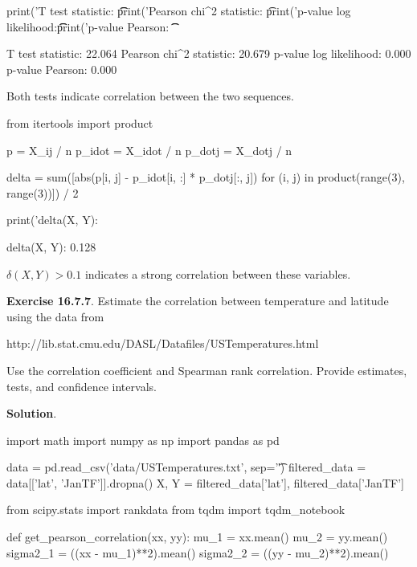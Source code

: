 {\begin{python}
print('T test statistic: \t\t%
print('Pearson chi^2 statistic: \t%

print('p-value log likelihood:\t\t %
print('p-value Pearson: \t\t %
\end{python}

\begin{console}
T test statistic:               22.064
Pearson chi\^{}2 statistic:        20.679
p-value log likelihood:          0.000
p-value Pearson:                 0.000
\end{console}

Both tests indicate correlation between the two sequences.

\begin{python}
from itertools import product

p = X_ij / n
p_idot = X_idot / n
p_dotj = X_dotj / n

delta = sum([abs(p[i, j] - p_idot[i, :] * p_dotj[:, j]) for (i, j) in product(range(3), range(3))]) / 2

print('delta(X, Y): %
\end{python}

\begin{console}
delta(X, Y): 0.128
\end{console}

\(\delta(X, Y) > 0.1\) indicates a strong correlation between these
variables.

\textbf{Exercise 16.7.7}. Estimate the correlation between temperature
and latitude using the data from

http://lib.stat.cmu.edu/DASL/Datafiles/USTemperatures.html

Use the correlation coefficient and Spearman rank correlation. Provide
estimates, tests, and confidence intervals.

\textbf{Solution}.

\begin{python}
import math
import numpy as np
import pandas as pd

data = pd.read_csv('data/USTemperatures.txt', sep='\t')
filtered_data = data[['lat', 'JanTF']].dropna()
X, Y = filtered_data['lat'], filtered_data['JanTF']
\end{python}

\begin{python}
from scipy.stats import rankdata
from tqdm import tqdm_notebook

def get_pearson_correlation(xx, yy):
    mu_1 = xx.mean()
    mu_2 = yy.mean()
    sigma2_1 = ((xx - mu_1)**2).mean()
    sigma2_2 = ((yy - mu_2)**2).mean()
    

\end{python}}
